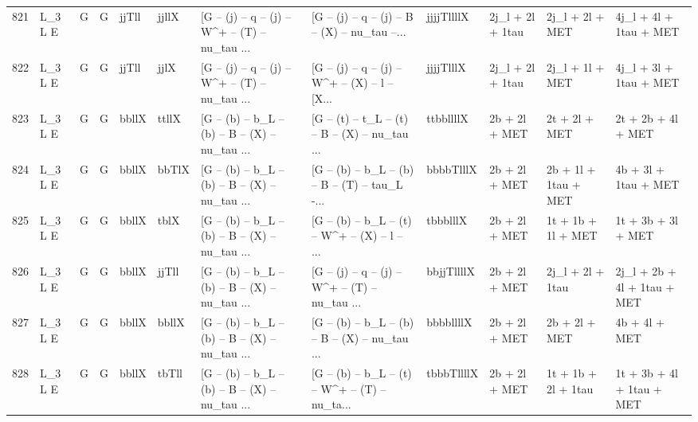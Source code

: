 \begin{tabular}{llllllllllll}
821  &      L\_3 L E &     G &     G &       jjTll &       jjllX &  [G -- (j) -- q -- (j) -- W\textasciicircum + -- (T) -- nu\_tau ... &  [G -- (j) -- q -- (j) -- B -- (X) -- nu\_tau --... &  jjjjTllllX &         2j\_l + 2l + 1tau &          2j\_l + 2l + MET &             4j\_l + 4l + 1tau + MET \\
822  &      L\_3 L E &     G &     G &       jjTll &        jjlX &  [G -- (j) -- q -- (j) -- W\textasciicircum + -- (T) -- nu\_tau ... &  [G -- (j) -- q -- (j) -- W\textasciicircum + -- (X) -- l -- [X... &   jjjjTlllX &         2j\_l + 2l + 1tau &          2j\_l + 1l + MET &             4j\_l + 3l + 1tau + MET \\
823  &      L\_3 L E &     G &     G &       bbllX &       ttllX &  [G -- (b) -- b\_L -- (b) -- B -- (X) -- nu\_tau ... &  [G -- (t) -- t\_L -- (t) -- B -- (X) -- nu\_tau ... &   ttbbllllX &            2b + 2l + MET &            2t + 2l + MET &                 2t + 2b + 4l + MET \\
824  &      L\_3 L E &     G &     G &       bbllX &       bbTlX &  [G -- (b) -- b\_L -- (b) -- B -- (X) -- nu\_tau ... &  [G -- (b) -- b\_L -- (b) -- B -- (T) -- tau\_L -... &   bbbbTlllX &            2b + 2l + MET &     2b + 1l + 1tau + MET &               4b + 3l + 1tau + MET \\
825  &      L\_3 L E &     G &     G &       bbllX &        tblX &  [G -- (b) -- b\_L -- (b) -- B -- (X) -- nu\_tau ... &  [G -- (b) -- b\_L -- (t) -- W\textasciicircum + -- (X) -- l -- ... &    tbbblllX &            2b + 2l + MET &       1t + 1b + 1l + MET &                 1t + 3b + 3l + MET \\
826  &      L\_3 L E &     G &     G &       bbllX &       jjTll &  [G -- (b) -- b\_L -- (b) -- B -- (X) -- nu\_tau ... &  [G -- (j) -- q -- (j) -- W\textasciicircum + -- (T) -- nu\_tau ... &  bbjjTllllX &            2b + 2l + MET &         2j\_l + 2l + 1tau &        2j\_l + 2b + 4l + 1tau + MET \\
827  &      L\_3 L E &     G &     G &       bbllX &       bbllX &  [G -- (b) -- b\_L -- (b) -- B -- (X) -- nu\_tau ... &  [G -- (b) -- b\_L -- (b) -- B -- (X) -- nu\_tau ... &   bbbbllllX &            2b + 2l + MET &            2b + 2l + MET &                      4b + 4l + MET \\
828  &      L\_3 L E &     G &     G &       bbllX &       tbTll &  [G -- (b) -- b\_L -- (b) -- B -- (X) -- nu\_tau ... &  [G -- (b) -- b\_L -- (t) -- W\textasciicircum + -- (T) -- nu\_ta... &  tbbbTllllX &            2b + 2l + MET &      1t + 1b + 2l + 1tau &          1t + 3b + 4l + 1tau + MET \\

\end{tabular}
